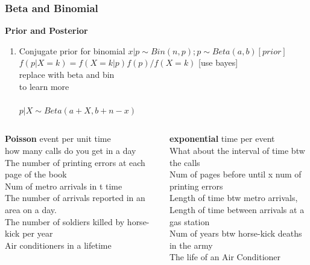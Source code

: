 \documentclass{beamer}
\begin{document}
\begin{frame}\frametitle{\hypertarget{betabino}{Beta and Binomial}}
\textbf{Prior and Posterior}
\begin{enumerate}
\item 	Conjugate prior for binomial
$ x|p \sim Bin(n,p); p \sim Beta(a,b) [prior]$\\
$ f(p|X=k) = f(X=k | p) f(p) / f(X=k)$ [use bayes]\\
replace with beta and bin \\
to learn more\\
$  $ \\

$ p|X \sim Beta(a+X, b+n-x) $

\end{enumerate}
\end{frame}


\begin{frame}%
\begin{columns}
\begin{column}{0.45\textwidth}
\textbf{Poisson}
event per unit time
\\how many calls do you get in a day
\\The number of printing errors at each page of the book
\\Num of metro arrivals in t time
\\The number of arrivals reported in an area on a day.
\\ The number of soldiers killed by horse-kick per year
\\ Air conditioners in a lifetime
\end{column}
\begin{column}{0.45\textwidth}
\textbf{exponential}
time per event
\\What about the interval of time btw the calls
\\Num of pages before until x num of printing errors
\\ Length of time btw metro arrivals,
\\ Length of time between arrivals at a gas station
\\Num of years btw horse-kick deaths in the army
\\ The life of an Air Conditioner

\end{column}

\end{columns}
\end{frame}
\end{document}
